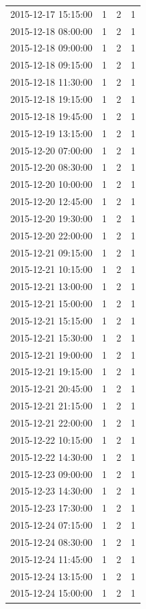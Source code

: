 \begin{tabular}{lrrr}
2015-12-17 15:15:00 & 1 & 2 & 1 \\
2015-12-18 08:00:00 & 1 & 2 & 1 \\
2015-12-18 09:00:00 & 1 & 2 & 1 \\
2015-12-18 09:15:00 & 1 & 2 & 1 \\
2015-12-18 11:30:00 & 1 & 2 & 1 \\
2015-12-18 19:15:00 & 1 & 2 & 1 \\
2015-12-18 19:45:00 & 1 & 2 & 1 \\
2015-12-19 13:15:00 & 1 & 2 & 1 \\
2015-12-20 07:00:00 & 1 & 2 & 1 \\
2015-12-20 08:30:00 & 1 & 2 & 1 \\
2015-12-20 10:00:00 & 1 & 2 & 1 \\
2015-12-20 12:45:00 & 1 & 2 & 1 \\
2015-12-20 19:30:00 & 1 & 2 & 1 \\
2015-12-20 22:00:00 & 1 & 2 & 1 \\
2015-12-21 09:15:00 & 1 & 2 & 1 \\
2015-12-21 10:15:00 & 1 & 2 & 1 \\
2015-12-21 13:00:00 & 1 & 2 & 1 \\
2015-12-21 15:00:00 & 1 & 2 & 1 \\
2015-12-21 15:15:00 & 1 & 2 & 1 \\
2015-12-21 15:30:00 & 1 & 2 & 1 \\
2015-12-21 19:00:00 & 1 & 2 & 1 \\
2015-12-21 19:15:00 & 1 & 2 & 1 \\
2015-12-21 20:45:00 & 1 & 2 & 1 \\
2015-12-21 21:15:00 & 1 & 2 & 1 \\
2015-12-21 22:00:00 & 1 & 2 & 1 \\
2015-12-22 10:15:00 & 1 & 2 & 1 \\
2015-12-22 14:30:00 & 1 & 2 & 1 \\
2015-12-23 09:00:00 & 1 & 2 & 1 \\
2015-12-23 14:30:00 & 1 & 2 & 1 \\
2015-12-23 17:30:00 & 1 & 2 & 1 \\
2015-12-24 07:15:00 & 1 & 2 & 1 \\
2015-12-24 08:30:00 & 1 & 2 & 1 \\
2015-12-24 11:45:00 & 1 & 2 & 1 \\
2015-12-24 13:15:00 & 1 & 2 & 1 \\
2015-12-24 15:00:00 & 1 & 2 & 1 \\

\end{tabular}
